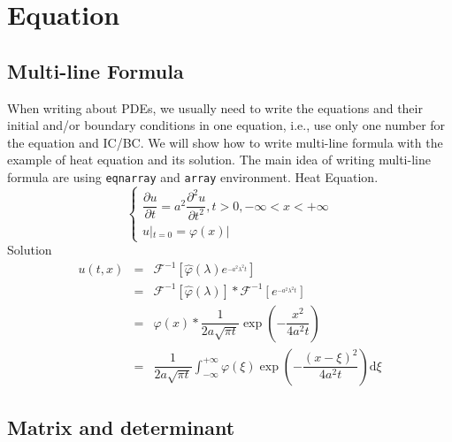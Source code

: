 \section{Equation}

\subsection{Multi-line Formula}

When writing about PDEs, we usually need to write the equations and their initial and/or boundary conditions in one equation, i.e., use only one number for the equation and IC/BC\@. We will show how to write multi-line formula with the example of heat equation and its solution. The main idea of writing multi-line formula are using \verb|eqnarray| and \verb|array| environment.
Heat Equation.
\begin{equation}
    \left\{\begin{array}{l}
        \dfrac{\partial u}{\partial t} = a^2 \dfrac{\partial^2 u}{\partial t^2}, t
        > 0, - \infty < x < + \infty \\
        u |_{t = 0} = \varphi (x) |
    \end{array}\right.
\end{equation}
Solution
\begin{eqnarray}
    u (t, x) & = & \mathcal{F}^{- 1} \left[ \hat{\varphi} (\lambda) e^{_{- a^2
                        \lambda^2 t}} \right] \nonumber\\
    & = & \mathcal{F}^{- 1} [\hat{\varphi} (\lambda)] \ast \mathcal{F}^{- 1}
    \left[ e^{_{- a^2 \lambda^2 t}} \right] \nonumber\\
    & = & \varphi (x) \ast \dfrac{1}{2 a \sqrt{\pi t}} \exp \left( -
    \dfrac{x^2}{4 a^2 t} \right) \nonumber\\
    & = & \dfrac{1}{2 a \sqrt{\pi t}} \int_{- \infty}^{+ \infty} \varphi (\xi)
    \exp \left( - \dfrac{(x - \xi)^2}{4 a^2 t} \right) \mathrm{d} \xi
\end{eqnarray}

\subsection{Matrix and determinant}

